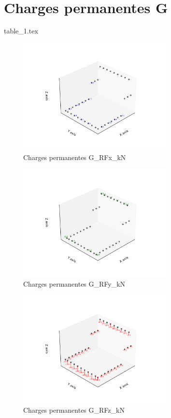 
\section{Charges permanentes G}
{table_1.tex}

\begin{figure}[H] %
     \centering %
     \includegraphics[width=0.7\textwidth]{assets/img/graph3D_charges_cas_1_RFx_kN.png} %
     \caption{Charges permanentes G\_RFx\_kN} %
\end{figure}

\begin{figure}[H] %
     \centering %
     \includegraphics[width=0.7\textwidth]{assets/img/graph3D_charges_cas_1_RFy_kN.png} %
     \caption{Charges permanentes G\_RFy\_kN} %
\end{figure}

\begin{figure}[H] %
     \centering %
     \includegraphics[width=0.7\textwidth]{assets/img/graph3D_charges_cas_1_RFz_kN.png} %
     \caption{Charges permanentes G\_RFz\_kN} %
\end{figure}

